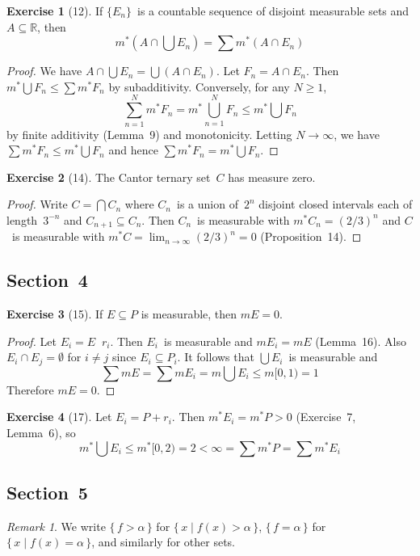 \documentclass[letterpaper,12pt]{article}
\newcommand{\R}{\mathbb{R}}
\newcommand{\sect}{\cap}
\newcommand{\bigunion}{\bigcup}
\newcommand{\bigsect}{\bigcap}
\DeclareMathOperator{\circplus}{\mathring{+}}
\newcommand{\mo}{m^*}
\newcommand{\m}{m}
\theoremstyle{plain}
\theoremstyle{definition}
\newtheorem*{exer}{Exercise}
\theoremstyle{remark}
\newtheorem*{rmk}{Remark}
\begin{document}
\begin{exer}[12]
If \(\{E_n\}\)~is a countable sequence of disjoint measurable sets and \(A\subseteq\R\), then
\[\mo\left(A\sect\bigunion E_n\right)=\sum\mo(A\sect E_n)\]
\end{exer}
\begin{proof}
We have \(A\sect\bigunion E_n=\bigunion(A\sect E_n)\). Let \(F_n=A\sect E_n\). Then \(\mo\bigunion F_n\le\sum\mo F_n\) by subadditivity. Conversely, for any \(N\ge 1\),
\[\sum_{n=1}^N\mo F_n=\mo\bigunion_{n=1}^N F_n\le\mo\bigunion F_n\]
by finite additivity (Lemma~9) and monotonicity. Letting \(N\to\infty\), we have \(\sum\mo F_n\le\mo\bigunion F_n\) and hence \(\sum\mo F_n=\mo\bigunion F_n\).
\end{proof}

\begin{exer}[14]
The Cantor ternary set~\(C\) has measure zero.
\end{exer}
\begin{proof}
Write \(C=\bigsect C_n\) where \(C_n\)~is a union of~\(2^n\) disjoint closed intervals each of length~\(3^{-n}\) and \(C_{n+1}\subseteq C_n\). Then \(C_n\)~is measurable with \(\mo C_n=(2/3)^n\) and \(C\)~is measurable with \(\mo C=\lim_{n\to\infty}(2/3)^n=0\) (Proposition~14).
\end{proof}

\subsection*{Section~4}
\begin{exer}[15]
If \(E\subseteq P\) is measurable, then \(\m E=0\).
\end{exer}
\begin{proof}
Let \(E_i=E\circplus r_i\). Then \(E_i\)~is measurable and \(\m E_i=\m E\) (Lemma~16). Also \(E_i\sect E_j=\emptyset\) for \(i\ne j\) since \(E_i\subseteq P_i\). It follows that \(\bigunion E_i\)~is measurable and
\[\sum\m E=\sum\m E_i=\m\bigunion E_i\le\m[0,1)=1\]
Therefore \(\m E=0\).
\end{proof}

\begin{exer}[17]
Let \(E_i=P+r_i\). Then \(\mo E_i=\mo P>0\) (Exercise~7, Lemma~6), so
\[\mo\bigunion E_i\le\mo[0,2)=2<\infty=\sum\mo P=\sum\mo E_i\]
\end{exer}

\subsection*{Section~5}
\begin{rmk}
We write \(\{\,f>\alpha\,\}\) for \(\{\,x\mid f(x)>\alpha\,\}\), \(\{\,f=\alpha\,\}\) for \(\{\,x\mid f(x)=\alpha\,\}\), and similarly for other sets.
\end{rmk}
\end{document}
